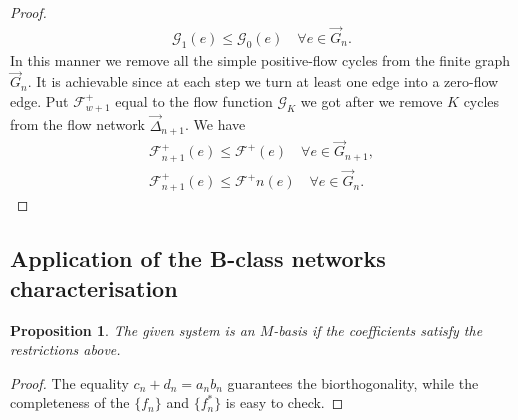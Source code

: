 \documentclass[12pt]{article}
\renewcommand{\cal}[1]{\mathcal{#1}}
\renewcommand{\leq}{\leqslant}
\newtheorem{prop}{Proposition}
\theoremstyle{definition}
\newcommand{\flowpos}{\mathcal{F}^{+}}
\newcommand{\flowposn}[1]{\mathcal{F}_{#1}^{+}}
\newcommand{\onet}{\vec{\Delta}}
\numberwithin{remark}{section}
\numberwithin{theorem}{section}
\numberwithin{prop}{section}
\numberwithin{equation}{section}
\numberwithin{lemma}{section}
\numberwithin{prop_under_lemma}{lemma}
\begin{document}
\begin{proof}
\begin{align*}
        \cal{G}_1(e) \leq \cal{G}_0(e) \quad \forall e \in \vec{G}_n.
      \end{align*}
      In this manner we remove all the simple positive-flow cycles from the finite graph $\vec{G}_n$. 
      It is achievable since at each step we turn at least one edge into a zero-flow edge.
      Put $\flowposn{w+1}$ equal to the flow function $\cal{G}_K$ we got after we remove $K$ cycles from the flow network $\onet_{n+1}$.
      We have
      \begin{align*}
        \flowposn{n+1}(e) \leq \flowpos(e) \quad \forall e \in \vec{G}_{n+1},\\
        \flowposn{n+1}(e) \leq \flowpos{n}(e) \quad \forall e \in \vec{G}_n.
      \end{align*}

    \end{proof}
    \subsection{Application of the B-class networks characterisation}
    \pagebreak
    \begin{prop}
        The given system is an $M$-basis if the coefficients satisfy the restrictions above.
    \end{prop}
    \begin{proof}
        The equality $c_n + d_n = a_n b_n$ guarantees the bi\-orthogonality,
        while the completeness of the $\{f_n\}$ and $\{f_n^*\}$ is
        easy to check.
    \end{proof}
    
\end{document}
